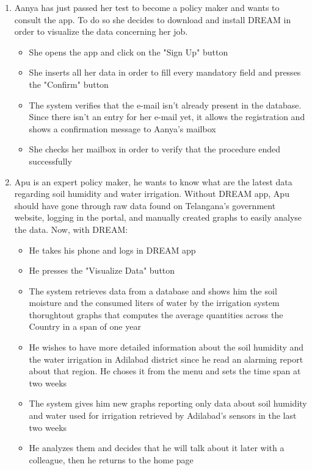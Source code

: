 \documentclass[table, 12pt]{article}
\begin{document}
\begin{enumerate}

    \item Aanya has just passed her test to become a policy maker and wants to consult the app.
    To do so she decides to download and install DREAM in order to visualize the data concerning her job.
    \begin{itemize}
        \item She opens the app and click on the "Sign Up" button
        \item She inserts all her data in order to fill every mandatory field and presses the "Confirm" button
        \item The system verifies that the e-mail isn't already present in the database. Since there isn't an entry for her e-mail yet, it allows the registration and shows a confirmation message to Aanya's mailbox
        \item She checks her mailbox in order to verify that the procedure ended successfully
    \end{itemize}

    \item Apu is an expert policy maker, he wants to know what are the latest data regarding soil humidity and water irrigation.
    Without DREAM app, Apu should have gone through raw data found on Telangana's government website, logging in the portal, and manually created graphs to easily analyse the data. Now, with DREAM:
    \begin{itemize}
        \item He takes his phone and logs in DREAM app 
        \item He presses the "Visualize Data" button
        \item The system retrieves data from a database and shows him the soil moisture and the consumed liters of water by the irrigation system thorughtout graphs that computes the average quantities across the Country in a span of one year
        \item He wishes to have more detailed information about the soil humidity and the water irrigation in Adilabad district since he read an alarming report about that region.
        He choses it from the menu and sets the time span at two weeks
        \item The system gives him new graphs reporting only data about soil humidity and water used for irrigation retrieved by Adilabad's sensors in the last two weeks
        \item He analyzes them and decides that he will talk about it later with a colleague, then he returns to the home page
    \end{itemize} 


\end{enumerate}
\end{document}
